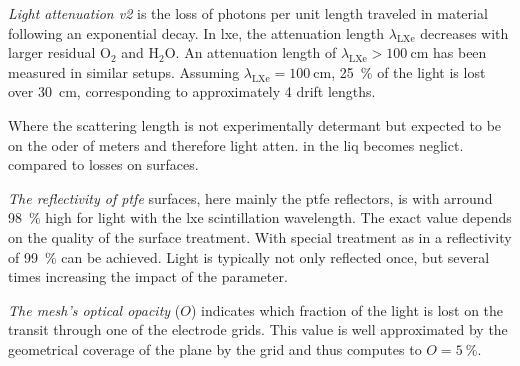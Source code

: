 \emph{Light attenuation v2} is the loss of photons per unit length traveled in material following an exponential decay.
In \gls{lxe}, the attenuation length $ \lambda_\mathrm{LXe} $ decreases with larger residual $ \mathrm{O}_2 $ and $ \mathrm{H}_2\mathrm{O} $.
An attenuation length of $ \lambda_\mathrm{LXe} > \SI{100}{\centi\m} $ has been measured in similar setups\cite{}.  %
Assuming $ \lambda_\mathrm{LXe} = \SI{100}{\centi\m} $, \SI{25}{\%} of the light is lost over \SI{30}{\centi\m}, corresponding to approximately 4 drift lengths.

Where the scattering length is not experimentally determant but expected to be on the oder of meters and therefore light atten. in the liq becomes neglict. compared to losses on surfaces.


\emph{The reflectivity of \gls{ptfe}} surfaces, here mainly the \gls{ptfe} reflectors, is with arround \SI{98}{\%} high for light with the \gls{lxe} scintillation wavelength.
The exact value depends on the quality of the surface treatment.
With special treatment as in \oneton a reflectivity of \SI{99}{\%} can be achieved\cite{}. %
Light is typically not only reflected once, but several times increasing the impact of the parameter.


\emph{The mesh's optical opacity} ($ O $) indicates which fraction of the light is lost on the transit through one of the electrode grids.
This value is well approximated by the geometrical coverage of the plane by the grid and thus computes to $ O = \SI{5}{\%} $.


